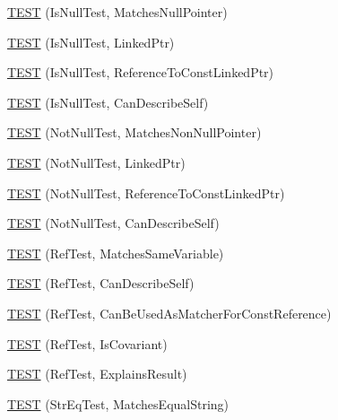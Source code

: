 \begin{DoxyCompactItemize}
\item 
\mbox{\hyperlink{namespacetesting_1_1gmock__matchers__test_ae1c2971c161e051bf52b86b62c51bb95}{T\+E\+ST}} (Is\+Null\+Test, Matches\+Null\+Pointer)
\item 
\mbox{\hyperlink{namespacetesting_1_1gmock__matchers__test_a0b1655e1640b7da6e1e7cc35074d9274}{T\+E\+ST}} (Is\+Null\+Test, Linked\+Ptr)
\item 
\mbox{\hyperlink{namespacetesting_1_1gmock__matchers__test_afaaf0776096c0ad62de8236ab1b774d7}{T\+E\+ST}} (Is\+Null\+Test, Reference\+To\+Const\+Linked\+Ptr)
\item 
\mbox{\hyperlink{namespacetesting_1_1gmock__matchers__test_a5ba91e0b79fcc0b17b1c1e373e741c38}{T\+E\+ST}} (Is\+Null\+Test, Can\+Describe\+Self)
\item 
\mbox{\hyperlink{namespacetesting_1_1gmock__matchers__test_a694ea33511eab7822b88d8e74b388534}{T\+E\+ST}} (Not\+Null\+Test, Matches\+Non\+Null\+Pointer)
\item 
\mbox{\hyperlink{namespacetesting_1_1gmock__matchers__test_aec956599ef91df968fec972247c7a28a}{T\+E\+ST}} (Not\+Null\+Test, Linked\+Ptr)
\item 
\mbox{\hyperlink{namespacetesting_1_1gmock__matchers__test_a9e9560feb52f60475f653c15cc7466aa}{T\+E\+ST}} (Not\+Null\+Test, Reference\+To\+Const\+Linked\+Ptr)
\item 
\mbox{\hyperlink{namespacetesting_1_1gmock__matchers__test_a68da7653e6a480c60a3a03fe8afb20fc}{T\+E\+ST}} (Not\+Null\+Test, Can\+Describe\+Self)
\item 
\mbox{\hyperlink{namespacetesting_1_1gmock__matchers__test_a199983108927dadee9bd2e03ddd6057d}{T\+E\+ST}} (Ref\+Test, Matches\+Same\+Variable)
\item 
\mbox{\hyperlink{namespacetesting_1_1gmock__matchers__test_ad8fc5a82cbb4b5b8147798be06d7059b}{T\+E\+ST}} (Ref\+Test, Can\+Describe\+Self)
\item 
\mbox{\hyperlink{namespacetesting_1_1gmock__matchers__test_af1e64d057f2c46cc17f1c96a075cde6b}{T\+E\+ST}} (Ref\+Test, Can\+Be\+Used\+As\+Matcher\+For\+Const\+Reference)
\item 
\mbox{\hyperlink{namespacetesting_1_1gmock__matchers__test_a03b45cf0f65f33208ac378b8603ff67a}{T\+E\+ST}} (Ref\+Test, Is\+Covariant)
\item 
\mbox{\hyperlink{namespacetesting_1_1gmock__matchers__test_ab73595bcf8dd511b519b640248136ccd}{T\+E\+ST}} (Ref\+Test, Explains\+Result)
\item 
\mbox{\hyperlink{namespacetesting_1_1gmock__matchers__test_a5956b46686ad29d2d29b313bce9eba8a}{T\+E\+ST}} (Str\+Eq\+Test, Matches\+Equal\+String)

\end{DoxyCompactItemize}
